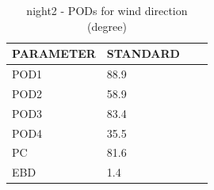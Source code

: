 \begin{table}[p!]
\begin{center}
\begin{tabular}{|l|l|l|l|}
\hline
\multicolumn{1}{|c|}{\cellcolor[HTML]{C0C0C0}\textbf{PARAMETER}} & \multicolumn{1}{c|}{\cellcolor[HTML]{C0C0C0}\textbf{STANDARD}}\\
\hline
\cellcolor[HTML]{C0C0C0}POD1  & 88.9      \\
\cellcolor[HTML]{C0C0C0}POD2  & 58.9      \\
\cellcolor[HTML]{C0C0C0}POD3  & 83.4      \\
\cellcolor[HTML]{C0C0C0}POD4  & 35.5      \\
\cellcolor[HTML]{C0C0C0}PC    & 81.6        \\
\cellcolor[HTML]{C0C0C0}EBD   & 1.4       \\
\hline
\end{tabular}
\caption{night2 - PODs for wind direction (degree)}
\label{tab:podwd:night2}
\end{center}
\end{table}
